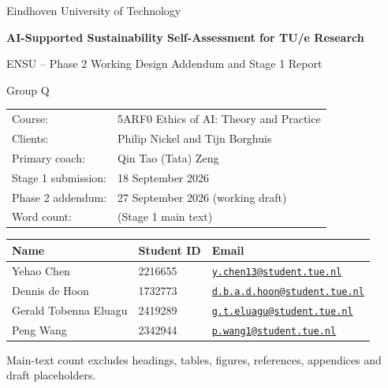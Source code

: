 \documentclass[11pt,a4paper]{article}
\begin{document}
\hypersetup{pageanchor=false}
\begin{titlepage}
\centering
\vspace*{3cm}
{\Large Eindhoven University of Technology\par}
\vspace{1.5cm}
{\huge\bfseries AI-Supported Sustainability Self-Assessment for TU/e Research\par}
\vspace{0.6cm}
{\Large ENSU -- Phase 2 Working Design Addendum and Stage 1 Report\par}
{\Large Group Q\par}
\vfill
\begin{tabularx}{0.95\textwidth}{@{}lX@{}}
Course: & 5ARF0 Ethics of AI: Theory and Practice \\
Clients: & Philip Nickel and Tijn Borghuis \\
Primary coach: & Qin Tao (Tata) Zeng \\
Stage 1 submission: & 18 September 2026 \\
Phase 2 addendum: & 27 September 2026 (working draft) \\
Word count: & \mainwordcount{} (Stage 1 main text)
\end{tabularx}

\vspace{1cm}
\begin{tabularx}{0.95\textwidth}{@{}p{}p{}X@{}}
\toprule
Name & Student ID & Email \\
\midrule
Yehao Chen & 2216655 & \href{mailto:y.chen13@student.tue.nl}{\nolinkurl{y.chen13@student.tue.nl}} \\
Dennis de Hoon & 1732773 & \href{mailto:d.b.a.d.hoon@student.tue.nl}{\nolinkurl{d.b.a.d.hoon@student.tue.nl}} \\
Gerald Tobenna Eluagu & 2419289 & \href{mailto:g.t.eluagu@student.tue.nl}{\nolinkurl{g.t.eluagu@student.tue.nl}} \\
Peng Wang & 2342944 & \href{mailto:p.wang1@student.tue.nl}{\nolinkurl{p.wang1@student.tue.nl}} \\
\bottomrule
\end{tabularx}

\vspace{0.6cm}
{\footnotesize Main-text count excludes headings, tables, figures, references, appendices and draft placeholders.\par}

\vfill
\end{titlepage}
\hypersetup{pageanchor=true}
\end{document}
